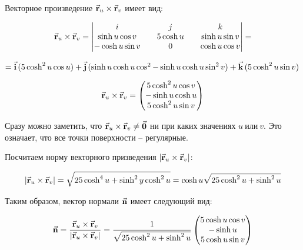 \documentclass[12pt,a4paper]{article}
\begin{document}
    Векторное произведение $ \vec{\textbf r}_u \times  \vec{\textbf r}_v $ имеет вид:

    \[
        \vec{\textbf r}_u \times  \vec{\textbf r}_v = 
            \begin{vmatrix}
                i && j && k
                \\
                \sinh u \cos v && 5\cosh u && \sinh u \sin v
                \\
                -\cosh u \sin v && 0 && \cosh u \cos v
            \end{vmatrix}
        =
    \]

    \bigskip

    \noindent $ = \vec{\textbf i}\,(5 \cosh^2 u \cos u ) + \vec{\textbf j}\,(\sinh u \cosh u \cos^2 - \sinh u \cosh u \sin^2 v) + \vec{\textbf k}\,(5 \cosh^2 u \sin v) $

    \[
        \vec{\textbf r}_u \times \vec{\textbf r}_v =
        \begin{pmatrix}
            5 \cosh^2 u \cos v
            \\
            -\sinh u \cosh u
            \\
            5 \cosh^2 u \sin v
        \end{pmatrix}
    \]

    Сразу можно заметить, что $ \vec{\textbf r}_u \times \vec{\textbf r}_v \ne \vec{\textbf 0}$ ни при каких значениях $ u \ \text{или} \ v $. Это означает, что все точки поверхности -- регулярные.

    \pagebreak

    Посчитаем норму векторного призведения $ | \vec{\textbf r}_u \times \vec{\textbf r}_v | $: 

    \[
        | \vec{\textbf r}_u \times \vec{\textbf r}_v | = \sqrt{25 \cosh^4 u + \sinh^2 y \cosh^2 u} = \cosh u \sqrt { 25 \cosh^2 u + \sinh^2 u } 
    \]

    Таким образом, вектор нормали $ \vec{\textbf n} $ имеет следующий вид: 
    
    \[
        \vec{\textbf n} = \frac{\vec{\textbf r}_u \times \vec{\textbf r}_v}{| \vec{\textbf r}_u \times \vec{\textbf r}_v |} = \frac{1}{\sqrt{25 \cosh^2 u + \sinh^2 u}}
        \begin{pmatrix}
            5 \cosh u \cos v
            \\
            -\sinh u
            \\
            5 \cosh u \sin v
        \end{pmatrix}
    \]
\end{document}
